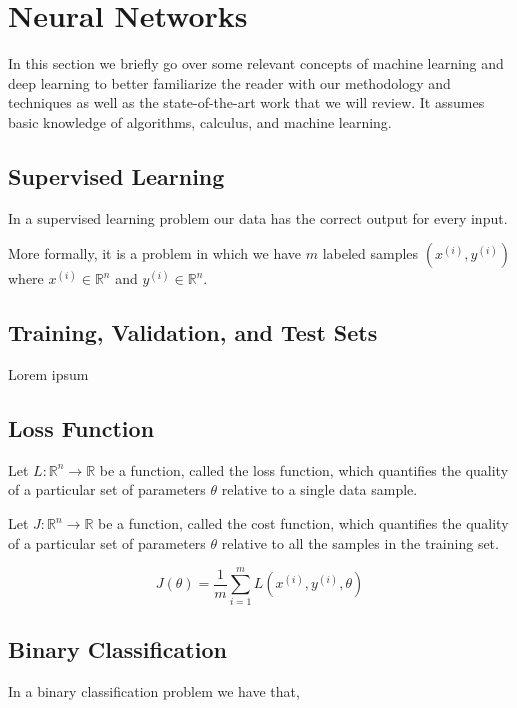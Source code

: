 \chapter{Neural Networks}
\label{chapter:neuralnetworks}

In this section we briefly go over some relevant concepts of machine learning and deep learning to better familiarize the reader with our methodology and techniques as well as the state-of-the-art work that we will review. It assumes basic knowledge of algorithms, calculus, and machine learning.

\section{Supervised Learning}

In a supervised learning problem our data has the correct output for every input.

More formally, it is a problem in which we have $m$ labeled samples $(x^{(i)}, y^{(i)})$ where $x^{(i)} \in \mathbb{R}^n$ and $y^{(i)} \in \mathbb{R}^n$.

\section{Training, Validation, and Test Sets}
Lorem ipsum

\section{Loss Function}

Let $L \colon \mathbb{R}^n \to \mathbb{R}$ be a function, called the loss function, which quantifies the quality of a particular set of parameters $\theta$ relative to a single data sample.

Let $J \colon \mathbb{R}^n \to \mathbb{R}$ be a function, called the cost function, which quantifies the quality of a particular set of parameters $\theta$ relative to all the samples in the training set.

$$
J(\theta) = \frac{1}{m} \sum_{i=1}^{m} L(x^{(i)}, y^{(i)}, \theta)
$$


\section{Binary Classification}

In a binary classification problem we have that,

